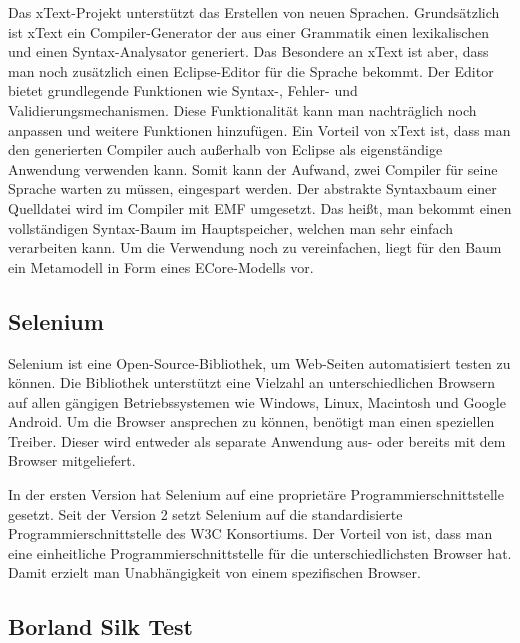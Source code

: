 Das xText-Projekt \cite{xtext} unterstützt das Erstellen von neuen Sprachen. Grundsätzlich ist xText ein Compiler-Generator der aus einer Grammatik einen lexikalischen und einen Syntax-Analysator generiert. Das Besondere an xText ist aber, dass man noch zusätzlich einen Eclipse-Editor für die Sprache bekommt. Der Editor bietet grundlegende Funktionen wie Syntax-, Fehler- und Validierungsmechanismen. Diese Funktionalität kann man nachträglich noch anpassen und weitere Funktionen hinzufügen. Ein Vorteil von xText ist, dass man den generierten Compiler auch außerhalb von Eclipse als eigenständige Anwendung verwenden kann. Somit kann der Aufwand, zwei Compiler für seine Sprache warten zu müssen, eingespart werden. Der abstrakte Syntaxbaum einer Quelldatei wird im Compiler mit EMF umgesetzt. Das heißt, man bekommt einen vollständigen Syntax-Baum im Hauptspeicher, welchen man sehr einfach verarbeiten kann. Um die Verwendung noch zu vereinfachen, liegt für den Baum ein Metamodell in Form eines ECore-Modells vor. 

\subsection{Selenium}

Selenium \cite{Selenium} ist eine Open-Source-Bibliothek, um Web-Seiten automatisiert testen zu können. Die Bibliothek unterstützt eine Vielzahl an unterschiedlichen Browsern auf allen gängigen Betriebssystemen wie Windows, Linux, Macintosh und Google Android. Um die Browser ansprechen zu können, benötigt man einen speziellen Treiber. Dieser wird entweder als separate Anwendung aus- oder bereits mit dem Browser mitgeliefert.

\SuperPar
In der ersten Version hat Selenium auf eine proprietäre Programmierschnittstelle gesetzt. Seit der Version 2 setzt Selenium auf die standardisierte Programmierschnittstelle  \cite{WebDriver} des W3C Konsortiums. Der Vorteil von  ist, dass man eine einheitliche Programmierschnittstelle für die unterschiedlichsten Browser hat. Damit erzielt man Unabhängigkeit von einem spezifischen Browser. 

\subsection{Borland Silk Test}

